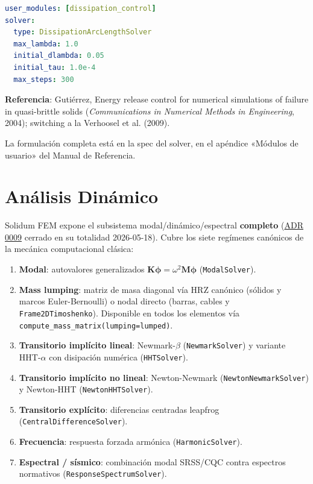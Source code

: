 \documentclass[11pt,oneside]{report}
\begin{document}
\begin{lstlisting}[language=yaml]
user_modules: [dissipation_control]
solver:
  type: DissipationArcLengthSolver
  max_lambda: 1.0
  initial_dlambda: 0.05
  initial_tau: 1.0e-4
  max_steps: 300

\end{lstlisting}

\textbf{Referencia}: Gutiérrez, \textquotedbl{}Energy release control for numerical simulations of failure in quasi-brittle solids\textquotedbl{} (\textit{Communications in Numerical Methods in Engineering}, 2004); switching a la Verhoosel et al. (2009).

La formulación completa está en la spec del solver, en el apéndice «Módulos de usuario» del Manual de Referencia.


\newpage

\chapter{Análisis Dinámico}
\label{cap:7}



Solidum FEM expone el subsistema modal/dinámico/espectral \textbf{completo} (\href{https://github.com/jretamav/solidum-fem/blob/main/docs/adr/0009-analisis-modal-y-dinamico.md}{ADR 0009} cerrado en su totalidad 2026-05-18). Cubre los siete regímenes canónicos de la mecánica computacional clásica:

\begin{enumerate}
  \item \textbf{Modal}: autovalores generalizados $\mathbf K \boldsymbol\phi = \omega^2\mathbf M\boldsymbol\phi$ (\texttt{ModalSolver}).
  \item \textbf{Mass lumping}: matriz de masa diagonal vía HRZ canónico (sólidos y marcos Euler-Bernoulli) o nodal directo (barras, cables y \texttt{Frame2DTimoshenko}). Disponible en todos los elementos vía \texttt{compute\_\allowbreak{}mass\_\allowbreak{}matrix(lumping=\textquotedbl{}lumped\textquotedbl{})}.
  \item \textbf{Transitorio implícito lineal}: Newmark-$\beta$ (\texttt{NewmarkSolver}) y variante HHT-$\alpha$ con disipación numérica (\texttt{HHTSolver}).
  \item \textbf{Transitorio implícito no lineal}: Newton-Newmark (\texttt{NewtonNewmarkSolver}) y Newton-HHT (\texttt{NewtonHHTSolver}).
  \item \textbf{Transitorio explícito}: diferencias centradas leapfrog (\texttt{CentralDifferenceSolver}).
  \item \textbf{Frecuencia}: respuesta forzada armónica (\texttt{HarmonicSolver}).
  \item \textbf{Espectral / sísmico}: combinación modal SRSS/CQC contra espectros normativos (\texttt{ResponseSpectrumSolver}).
\end{enumerate}
\end{document}
